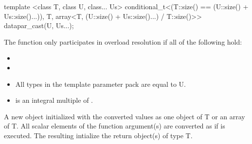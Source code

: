 \begin{itemdecl}
template <class T, class U, class... Us>
conditional_t<(T::size() == (U::size() + Us::size()...)), T,
            array<T, (U::size() + Us::size()...) / T::size()>> datapar_cast(U, Us...);
\end{itemdecl}
\begin{itemdescr}
  \pnum\remarks The  function only participates in overload resolution if all of the following hold:
  \begin{itemize}
    \item {}
    \item {}
    \item All types in the template parameter pack  are equal to \type U.
    \item {} is an integral multiple of .
  \end{itemize}

  \pnum\returns A new \datapar object initialized with the converted values as one object of \type T or an array of \type T.
  All scalar elements  of the function argument(s) are converted as if
   is executed.
  The resulting  intialize the return object(s) of type \type T.
\end{itemdescr}

